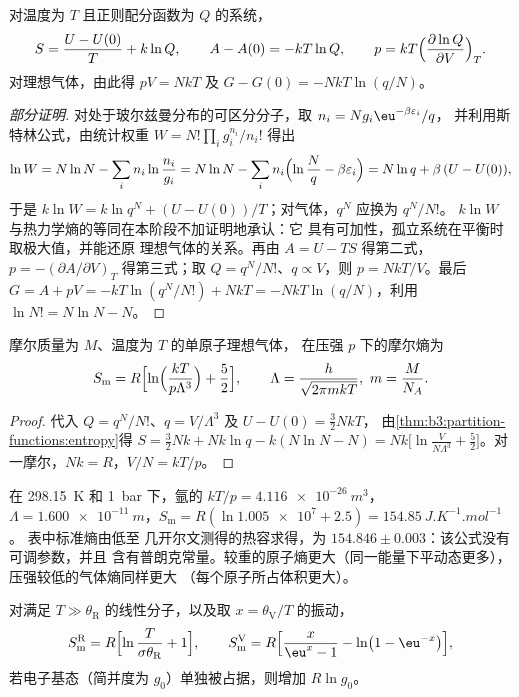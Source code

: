 \begin{theorem}[熵与其他函数]\label{thm:b3:partition-functions:entropy}
对温度为 $T$ 且正则配分函数为 $Q$ 的系统，
\[
  S = \frac{U - U(0)}{T} + k\ln Q, \qquad A - A(0) = -kT\ln Q, \qquad
  p = kT\Bigl(\frac{\partial\ln Q}{\partial V}\Bigr)_T .
\]
对理想气体，由此得 $pV = NkT$ 及 $G - G(0) = -NkT\ln(q/N)$。
\end{theorem}

\begin{proof}[部分证明]
对处于玻尔兹曼分布的可区分分子，取 $n_i = Ng_i\eu^{-\beta\varepsilon_i}/q$，
并利用斯特林公式，由统计权重 $W = N!\prod_ig_i^{n_i}/n_i!$ 得出
\[
  \ln W = N\ln N - \sum_in_i\ln\frac{n_i}{g_i} = N\ln N - \sum_in_i\Bigl(\ln\frac Nq - \beta\varepsilon_i\Bigr)
        = N\ln q + \beta\,(U - U(0)),
\]
于是 $k\ln W = k\ln q^N + (U - U(0))/T$；对气体，$q^N$ 应换为 $q^N/N!$。
$k\ln W$ 与热力学熵的等同在本阶段不加证明地承认：它
具有可加性，孤立系统在平衡时取极大值，并能还原
理想气体的关系。再由 $A = U - TS$ 得第二式，$p =
-(\partial A/\partial V)_T$ 得第三式；取 $Q = q^N/N!$、$q \propto V$，则 $p = NkT/V$。最后
$G = A + pV = -kT\ln(q^N/N!) + NkT = -NkT\ln(q/N)$，利用 $\ln N! = N\ln N - N$。
\end{proof}

\begin{theorem}\label{thm:b3:partition-functions:sackur-tetrode}
摩尔质量为 $M$、温度为 $T$ 的单原子理想气体，
在压强 $p$ 下的摩尔熵为
\[
  S_{\mathrm m} = R\Bigl[\ln\Bigl(\frac{kT}{p\Lambda^3}\Bigr) + \frac52\Bigr],
  \qquad \Lambda = \frac{h}{\sqrt{2\pi mkT}},\ m = \frac{M}{N_A}.
\]
\end{theorem}

\begin{proof}
代入 $Q = q^N/N!$、$q = V/\Lambda^3$ 及 $U - U(0) = \frac32NkT$，
由\cref{thm:b3:partition-functions:entropy}得 $S = \frac32Nk + Nk\ln q - k(N\ln N - N) =
Nk\bigl[\ln\frac{V}{N\Lambda^3} + \frac52\bigr]$。对一摩尔，$Nk = R$，$V/N = kT/p$。
\end{proof}

在 \qty{298.15}{K} 和 \qty{1}{bar} 下，氩的 $kT/p = \qty{4.116e-26}{m^3}$，$\Lambda =
\qty{1.600e-11}{m}$，$S_{\mathrm m} = R(\ln\num{1.005e7} + 2.5) = \qty{154.85}{J.K^{-1}.mol^{-1}}$。
表中标准熵由低至
几开尔文测得的热容求得，为 $154.846 \pm 0.003$：该公式没有可调参数，并且
含有普朗克常量。较重的原子熵更大（同一能量下平动态更多），
压强较低的气体熵同样更大
（每个原子所占体积更大）。

\begin{proposition}[转动和振动摩尔熵]\label{prop:b3:partition-functions:modes-entropy}
对满足 $T \gg \theta_{\mathrm R}$ 的线性分子，以及取 $x = \theta_{\mathrm V}/T$ 的振动，
\[
  S^{\mathrm R}_{\mathrm m} = R\Bigl[\ln\frac{T}{\sigma\theta_{\mathrm R}} + 1\Bigr],
  \qquad
  S^{\mathrm V}_{\mathrm m} = R\Bigl[\frac{x}{\eu^x - 1} - \ln\bigl(1 - \eu^{-x}\bigr)\Bigr],
\]
若电子基态（简并度为 $g_0$）单独被占据，则增加 $R\ln g_0$。
\end{proposition}

